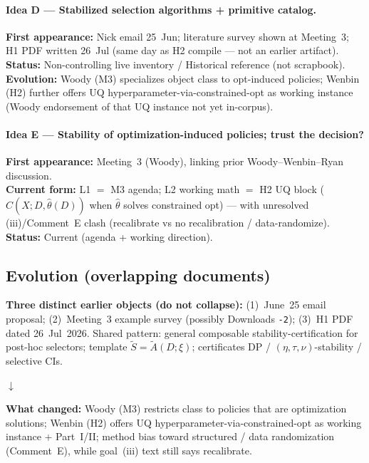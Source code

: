 \documentclass[11pt]{article}
\begin{document}
\paragraph{Idea D --- Stabilized selection algorithms + primitive catalog.}
\textbf{First appearance:} Nick email 25~Jun; literature survey shown at Meeting~3; H1 PDF
written 26~Jul (same day as H2 compile --- not an earlier artifact).\\
\textbf{Status:} Non-controlling live inventory / Historical reference (not scrapbook).\\
\textbf{Evolution:} Woody (M3) specializes object class to opt-induced policies;
Wenbin (H2) further offers UQ hyperparameter-via-constrained-opt as working instance
(Woody endorsement of that UQ instance not yet in-corpus).

\paragraph{Idea E --- Stability of optimization-induced policies; trust the decision?}
\textbf{First appearance:} Meeting~3 (Woody), linking prior Woody--Wenbin--Ryan discussion.\\
\textbf{Current form:} L1 $=$ M3 agenda; L2 working math $=$ H2 UQ block
($C(X;D,\hat\theta(D))$ when $\hat\theta$ solves constrained opt) --- with unresolved
(iii)/Comment~E clash (recalibrate vs no recalibration / data-randomize).\\
\textbf{Status:} \textcolor{current}{Current} (agenda + working direction).

\subsection{Evolution (overlapping documents)}

\textbf{Three distinct earlier objects (do not collapse):}
(1)~June~25 email proposal; (2)~Meeting~3 example survey (possibly Downloads \texttt{-2});
(3)~H1 PDF dated 26~Jul~2026.
Shared pattern: general composable stability-certification for post-hoc selectors;
template $\tilde S=\tilde A(D;\xi)$; certificates DP / $(\eta,\tau,\nu)$-stability /
selective CIs.

$\downarrow$

\textbf{What changed:}
Woody (M3) restricts class to policies that are optimization solutions;
Wenbin (H2) offers UQ hyperparameter-via-constrained-opt as working instance + Part~I/II;
method bias toward structured / data randomization (Comment~E), while goal~(iii) text still
says recalibrate.
\end{document}
